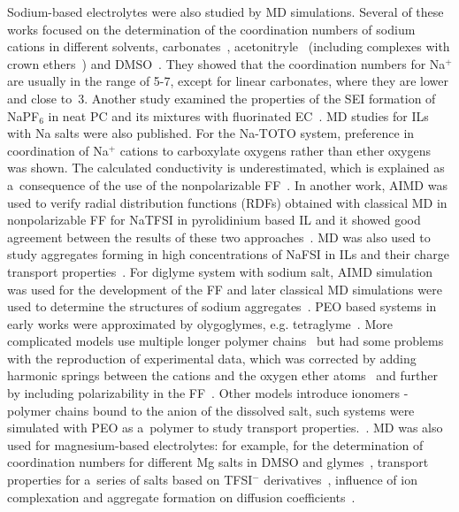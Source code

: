 Sodium-based electrolytes were also studied by MD simulations. Several of these works focused on the determination of the coordination numbers of sodium cations in different solvents, carbonates~\cite{na-md-1,na-md-6}, acetonitryle~\cite{na-md-2,na-md-5} (including complexes with crown ethers~\cite{na-md-4}) and DMSO~\cite{na-md-3}. They showed that the coordination numbers for Na$^{+}$ are usually in the range of 5-7, except for linear carbonates, where they are lower and close to~3. Another study examined the properties of the SEI formation of NaPF$_6$ in neat PC and its mixtures with fluorinated EC~\cite{na-md-7}. MD studies for ILs with Na salts were also published. For the Na-TOTO system, preference in coordination of Na$^{+}$ cations to carboxylate oxygens rather than ether oxygens was shown. The calculated conductivity is underestimated, which is explained as a~consequence of the use of the nonpolarizable FF~\cite{na-dft-5}. In another work, AIMD was used to verify radial distribution functions (RDFs) obtained with classical MD in nonpolarizable FF for NaTFSI in pyrolidinium based IL and it showed good agreement between the results of these two approaches~\cite{na-md-8}. MD was also used to study aggregates forming in high concentrations of NaFSI in ILs and their charge transport properties~\cite{na-il-9,na-md-9}. For diglyme system with sodium salt, AIMD simulation was used for the development of the FF and later classical MD simulations were used to determine the structures of sodium aggregates~\cite{na-interactions-1}. PEO based systems in early works were approximated by olygoglymes, e.g. tetraglyme~\cite{na-md-10}. More complicated models use multiple longer polymer chains~\cite{na-md-11} but had some problems with the reproduction of experimental data, which was corrected by adding harmonic springs between the cations and the oxygen ether atoms~\cite{na-md-12} and further by including polarizability in the FF~\cite{na-md-13}. Other models introduce ionomers - polymer chains bound to the anion of the dissolved salt, such systems were simulated with PEO as a~polymer to study transport properties.~\cite{na-md-14,na-md-15,na-md-16,na-md-17}. MD was also used for magnesium-based electrolytes: for example, for the determination of coordination numbers for different Mg salts in DMSO and glymes~\cite{mg-dft-2}, transport properties for a~series of salts based on TFSI$^{-}$ derivatives~\cite{mg-dft-6}, influence of ion complexation and aggregate formation on diffusion coefficients~\cite{mg-md-1,mg-md-2}.
